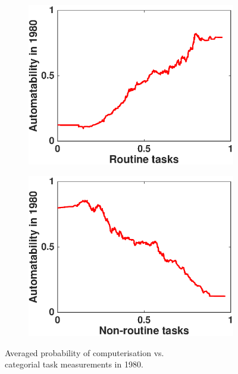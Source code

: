 \documentclass[11pt]{report}
\numberwithin{equation}{chapter}
\begin{document}
\begin{spacing}{2}
\begin{figure}[htb]
\begin{subfigure}{0.48\textwidth}
\centering
	\includegraphics[scale = 0.5]{routine.eps}
\end{subfigure}%
\begin{subfigure}{0.48\textwidth}
\centering
	\includegraphics[scale = 0.5]{non-routine.eps}
\end{subfigure}

\caption{Averaged probability of computerisation vs. \\categorial task measurements in 1980.}
\label{fig:1980cat}
\end{figure}


\end{spacing}
\end{document}
